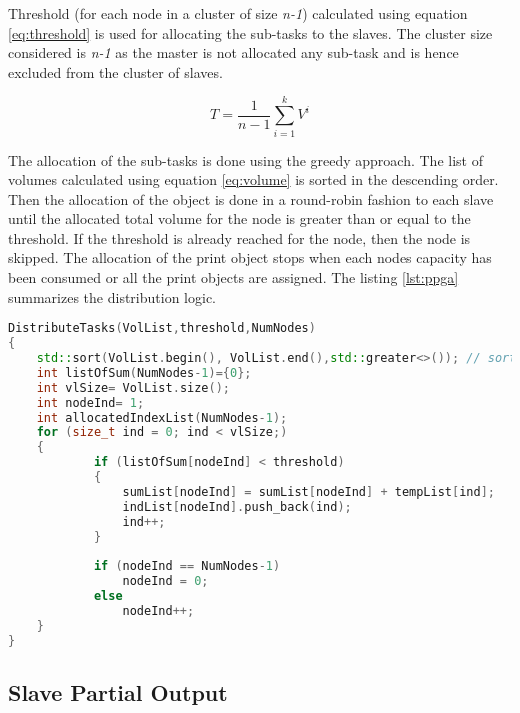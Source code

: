 Threshold (for each node in a cluster of size \textit{n-1}) calculated using equation \ref{eq:threshold} is used for allocating the sub-tasks to the slaves. The cluster size considered is \textit{n-1} as the master is not allocated any sub-task and is hence excluded from the cluster of slaves.

\begin{equation}
\label{eq:threshold}
T =\frac{1}{n-1}\sum\limits_{i=1}^{k}{V^i}
\end{equation}

The allocation of the sub-tasks is done using the greedy approach. The list of volumes calculated using equation \ref{eq:volume} is sorted in the  descending order. Then the allocation of the object is done in a round-robin fashion to each slave  until the allocated total volume  for the node is greater than or equal to the threshold. If the threshold is already reached for the node, then the node is skipped. The allocation of the print object stops when each node\textquotesingle s capacity has been consumed or all the print objects are assigned. The listing \ref{lst:ppga} summarizes the distribution logic.

\begin{lstlisting}[language=C++,label={lst:ppga},caption={Distribute Tasks- Greedy Approach}]
DistributeTasks(VolList,threshold,NumNodes)
{
	std::sort(VolList.begin(), VolList.end(),std::greater<>()); // sort in descending order
	int listOfSum(NumNodes-1)={0};
	int vlSize= VolList.size();
	int nodeInd= 1;
	int allocatedIndexList(NumNodes-1);
	for (size_t ind = 0; ind < vlSize;)
	{
			if (listOfSum[nodeInd] < threshold)
			{
				sumList[nodeInd] = sumList[nodeInd] + tempList[ind];
				indList[nodeInd].push_back(ind);
				ind++;
			}
			
			if (nodeInd == NumNodes-1)
				nodeInd = 0;
			else 
				nodeInd++;
	}
}
\end{lstlisting}

\subsection{Slave Partial Output}

